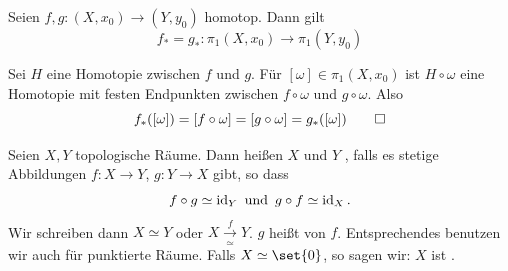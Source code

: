 \begin{proposition}[{name={Homotopieinvarianz von $\pi_1$}}]
	Seien $f,g \colon (X,x_0) \to (Y,y_0)$ homotop. Dann gilt 
	\[
		f_* = g_* \colon \pi_1(X,x_0) \to \pi_1(Y,y_0)
	\]
\end{proposition}
\begin{beweis}
	Sei $H$ eine Homotopie zwischen $f$ und $g$. 
	Für $[\omega] \in \pi_1(X,x_0)$ ist $H \circ \omega$ eine Homotopie mit festen Endpunkten zwischen $f \circ \omega$ und 
	$g \circ \omega$. Also 
	\[
		f_*([\omega]) = [f \circ \omega] = [g \circ \omega] = g_*([\omega]) \qedhere
	\]
\end{beweis}

\begin{definition}[{name=[homotopieäquivalent]}]
	Seien $X,Y$ topologische Räume. 
	Dann heißen $X$ und $Y$ , falls es stetige Abbildungen $f \colon X \to Y$, $g \colon Y \to X$ gibt, so dass
	\[
		f \circ g \simeq \operatorname{id}_Y \text{ und } \, g \circ  f \simeq \operatorname{id}_X.
	\]
	Wir schreiben dann $X \simeq Y$ oder $X \xrightarrow[\simeq]{f} Y$. 
	$g$ heißt  von $f$.
	Entsprechendes benutzen wir auch für punktierte Räume. 
	Falls $X \simeq \set{0}$, so sagen wir: $X$ ist .
\end{definition}


